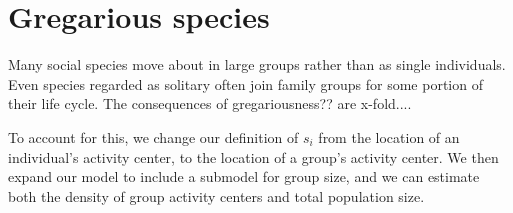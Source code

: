 \section{Gregarious species}

Many social species move about in large groups rather than as single
individuals. Even species regarded as solitary often join family
groups for some portion of their life cycle. The consequences of
gregariousness?? are x-fold....

To account for this, we change our definition of $s_i$ from the
location of an individual's activity center, to the location of a
group's activity center. We then expand our model to include a
submodel for group size, and we can estimate both the density of group
activity centers and total population size.
